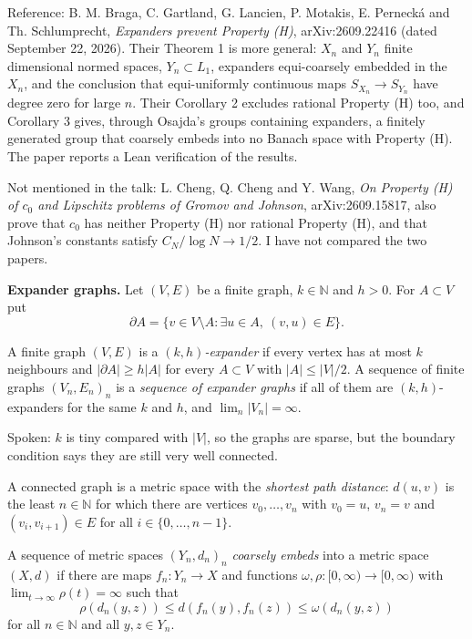 \begin{remark}
\label{remark-expanders-prevent-h-paper}
Reference: B. M. Braga, C. Gartland,
G. Lancien, P. Motakis, E. Pernecká and
Th. Schlumprecht, \emph{Expanders prevent
Property (H)}, arXiv:2609.22416 (dated
September 22, 2026). Their Theorem 1 is more
general: $X_n$ and $Y_n$ finite dimensional
normed spaces, $Y_n \subset L_1$, expanders
equi-coarsely embedded in the $X_n$, and the
conclusion that equi-uniformly continuous
maps $S_{X_n} \to S_{Y_n}$ have degree zero
for large $n$. Their Corollary 2 excludes
rational Property (H) too, and Corollary 3
gives, through Osajda's groups containing
expanders, a finitely generated group that
coarsely embeds into no Banach space with
Property (H). The paper reports a Lean
verification of the results.

Not mentioned in the talk: L. Cheng,
Q. Cheng and Y. Wang, \emph{On Property (H)
of $c_0$ and Lipschitz problems of Gromov and
Johnson}, arXiv:2609.15817, also prove that
$c_0$ has neither Property (H) nor rational
Property (H), and that Johnson's constants
satisfy $C_N / \log N \to 1/2$. I have not
compared the two papers.
\end{remark}

\medskip\noindent
{\bf Expander graphs.} Let $(V,E)$ be a
finite graph, $k \in \mathbb{N}$ and $h > 0$.
For $A \subset V$ put
$$
\partial A
= \{v \in V \setminus A :
\exists u \in A,\ (v,u) \in E\}.
$$

\begin{definition}
\label{definition-expander}
A finite graph $(V,E)$ is a
\emph{$(k,h)$-expander} if every vertex has
at most $k$ neighbours and
$|\partial A| \ge h|A|$ for every
$A \subset V$ with $|A| \le |V|/2$. A
sequence of finite graphs $(V_n,E_n)_n$ is a
\emph{sequence of expander graphs} if all of
them are $(k,h)$-expanders for the same $k$
and $h$, and $\lim_n |V_n| = \infty$.
\end{definition}

\noindent
Spoken: $k$ is tiny compared with $|V|$, so
the graphs are sparse, but the boundary
condition says they are still very well
connected.

A connected graph is a metric space with the
\emph{shortest path distance}: $d(u,v)$ is
the least $n \in \mathbb{N}$ for which there
are vertices $v_0, \ldots, v_n$ with
$v_0 = u$, $v_n = v$ and
$(v_i,v_{i+1}) \in E$ for all
$i \in \{0,\ldots,n-1\}$.

\begin{definition}
\label{definition-coarse-embedding-sequence}
A sequence of metric spaces $(Y_n,d_n)_n$
\emph{coarsely embeds} into a metric space
$(X,d)$ if there are maps
$f_n : Y_n \to X$ and functions
$\omega,\rho : [0,\infty) \to [0,\infty)$
with $\lim_{t\to\infty} \rho(t) = \infty$
such that
$$
\rho(d_n(y,z))
\le d(f_n(y),f_n(z))
\le \omega(d_n(y,z))
$$
for all $n \in \mathbb{N}$ and all
$y,z \in Y_n$.
\end{definition}

